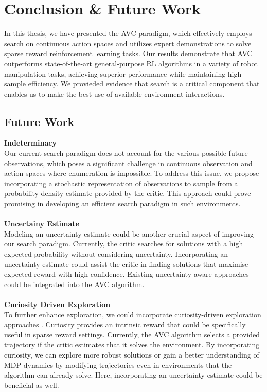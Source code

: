 
\chapter{Conclusion & Future Work}
\label{chapter:Conc_Fut}
In this thesis, we have presented the AVC paradigm, which effectively employs search on continuous action spaces and utilizes 
expert demonstrations to solve sparse reward reinforcement learning tasks. Our results demonstrate that AVC 
outperforms state-of-the-art general-purpose RL algorithms in a variety of robot manipulation tasks, achieving superior performance 
while maintaining high sample efficiency. We provieded evidence that search is a critical component that enables us to make the best use of available 
environment interactions.

\section{Future Work}
\textbf{Indeterminacy}\\
Our current search paradigm does not account for the various possible future observations, which poses a significant challenge in 
continuous observation and action spaces where enumeration is impossible. To address this issue, we propose incorporating a stochastic 
representation of observations to sample from a probability density estimate provided by the critic. 
This approach could prove promising in developing an efficient search paradigm in such environments. \\ \\

\textbf{Uncertainy Estimate}\\
Modeling an uncertainty estimate could be another crucial aspect of improving our search paradigm. 
Currently, the critic searches for solutions with a high expected probability without considering uncertainty. 
Incorporating an uncertainty estimate could assist the critic in finding solutions that maximise expected reward with high confidence. 
Existing uncertainty-aware approaches \cite{gawlikowski2022survey,liu2022simple} 
could be integrated into the AVC algorithm.\\ \\

\textbf{Curiosity Driven Exploration}\\
To further enhance exploration, we could incorporate curiosity-driven exploration approaches \cite{pathak2017curiositydriven}. 
Curiosity provides an intrinsic reward that could be specifically useful in sparse reward settings. 
Currently, the AVC algorithm selects a provided trajectory if the critic estimates that it solves the environment. By incorporating curiosity, 
we can explore more robust solutions or gain a better understanding of MDP dynamics by modifying trajectories even in environments that the 
algorithm can already solve. Here, incorporating an uncertainty estimate could be beneficial as well.